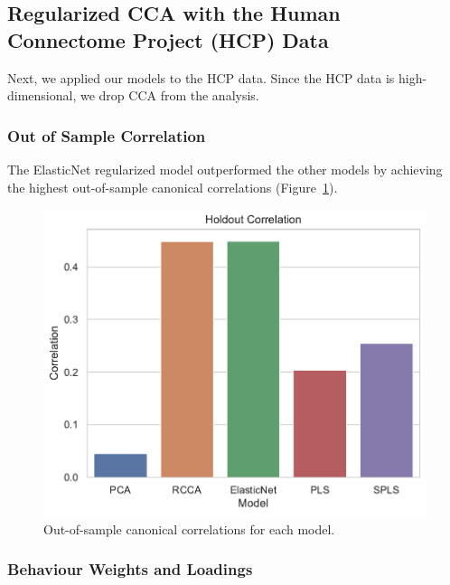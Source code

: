 \subsection{Regularized CCA with the Human Connectome Project (HCP) Data}

Next, we applied our models to the HCP data. Since the HCP data is high-dimensional, we drop CCA from the analysis.

\subsubsection{Out of Sample Correlation}

The ElasticNet regularized model outperformed the other models by achieving the highest out-of-sample canonical correlations (Figure~\ref{fig:performance}).

\begin{figure}
\centering
\includegraphics[width=0.5\linewidth]{figures/regularization/hcp/holdout_correlations.pdf}
\caption{Out-of-sample canonical correlations for each model.}\label{fig:performance}
\end{figure}

%

\subsubsection{Behaviour Weights and Loadings}

